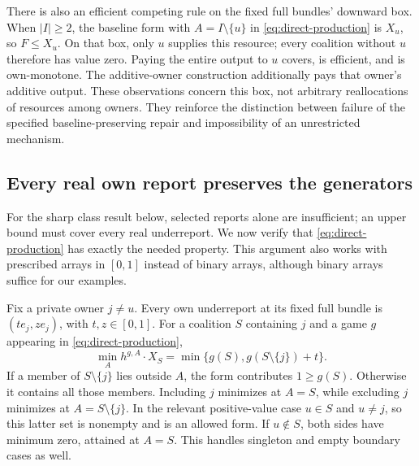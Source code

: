 \documentclass[11pt]{article}
\theoremstyle{definition}
\theoremstyle{remark}
\begin{document}
There is also an efficient competing rule on the fixed full bundles'
downward box.  When $|I|\ge2$, the baseline form with $A=I\setminus\{u\}$
in \eqref{eq:direct-production} is $X_u$, so $F\le X_u$.  On that box,
only $u$ supplies this resource; every coalition without $u$ therefore
has value zero.  Paying the entire output to $u$ covers, is efficient,
and is own-monotone.  The additive-owner construction additionally pays
that owner's additive output.  These observations concern this box,
not arbitrary reallocations of resources among owners.  They reinforce
the distinction between failure of the specified baseline-preserving
repair and impossibility of an unrestricted mechanism.

\subsection{Every real own report preserves the generators}
\label{app:real-reports}

For the sharp class result below, selected reports alone are insufficient;
an upper bound must cover every real underreport.  We now verify that
\eqref{eq:direct-production} has exactly the needed property.  This
argument also works with prescribed arrays in $[0,1]$ instead of binary
arrays, although binary arrays suffice for our examples.

Fix a private owner $j\ne u$.  Every own underreport at its fixed full
bundle is $(t e_j,z e_j)$, with $t,z\in[0,1]$.  For a coalition $S$
containing $j$ and a game $g$ appearing in \eqref{eq:direct-production},
\begin{equation}
 \min_A h^{g,A}\cdot X_S
       =\min\{g(S),g(S\setminus\{j\})+t\}.
 \label{eq:real-base-form}
\end{equation}
If a member of $S\setminus\{j\}$ lies outside $A$, the form contributes
$1\ge g(S)$.  Otherwise it contains all those members.  Including $j$
minimizes at $A=S$, while excluding $j$ minimizes at
$A=S\setminus\{j\}$.  In the relevant positive-value case $u\in S$
and $u\ne j$, so this latter set is nonempty and is an allowed form.
If $u\notin S$, both sides have minimum zero, attained at $A=S$.
This handles singleton and empty boundary cases as well.
\end{document}
